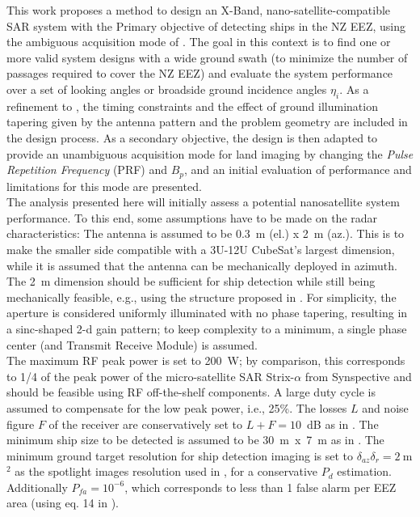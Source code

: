\documentclass[conference,a4paper]{IEEEtran}
\begin{document}
    This work proposes a method to design an X-Band, nano-satellite-compatible SAR system with the Primary objective of detecting ships in the NZ EEZ, using the ambiguous acquisition mode of \cite{DLRjournal}.
    The goal in this context is to find one or more valid system designs with a wide ground swath (to minimize the number of passages required to cover the NZ EEZ) and evaluate the system performance over a set of looking angles or broadside ground incidence angles $\eta_i$.
    As a refinement to \cite{DLRjournal}, the timing constraints and the effect of ground illumination tapering given by the antenna pattern and the problem geometry are included in the design process.
    As a secondary objective, the design is then adapted to provide an unambiguous acquisition mode for land imaging by changing the \emph{Pulse Repetition Frequency} (PRF) and $B_p$, and an initial evaluation of performance and limitations for this mode are presented.\\
    The analysis presented here will initially assess a potential nanosatellite system performance.
    To this end, some assumptions have to be made on the radar characteristics: The antenna is assumed to be 0.3~m (el.) x 2~m (az.).
    This is to make the smaller side compatible with a 3U-12U CubeSat's largest dimension, while it is assumed that the antenna can be mechanically deployed in azimuth.
    The 2~m dimension should be sufficient for ship detection \cite{DLRjournal} while still being mechanically feasible, e.g., using the structure proposed in \cite{Annalisa}.
    For simplicity, the aperture is considered uniformly illuminated with no phase tapering, resulting in a sinc-shaped 2-d gain pattern;
    to keep complexity to a minimum, a single phase center (and Transmit Receive Module) is assumed.\\
    The maximum RF peak power is set to 200~W; by comparison, this corresponds to 1/4 of the peak power of the micro-satellite SAR Strix-$\alpha$ from Synspective \cite{StriX-a} and should be feasible using RF off-the-shelf components.
    A large duty cycle is assumed to compensate for the low peak power, i.e., 25\%. The losses $L$ and noise figure $F$ of the receiver are conservatively set to $L+F = 10$~dB as in \cite{JAN}.
    The minimum ship size to be detected is assumed to be 30~m~x~7~m as in \cite{JAN}.
    The minimum ground target resolution for ship detection imaging is set to $\delta_{az}\delta_{r}=2~$m$^2$ as the spotlight images resolution used in \cite{DLRjournal}, for a conservative $P_d$ estimation.
    Additionally $P_{fa} = 10^{-6}$, which corresponds to less than 1 false alarm per EEZ area (using eq. 14 in \cite{DLRjournal}).\\
\end{document}
